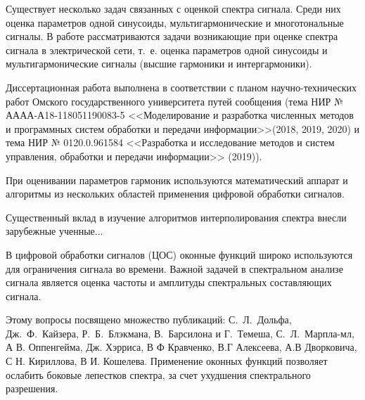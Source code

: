 Существует несколько задач связанных с оценкой спектра сигнала. Среди них оценка параметров одной синусоиды, мультигармонические и многотональные сигналы. В работе рассматриваются задачи возникающие при оценке спектра сигнала в электрической сети, т.~е. оценка параметров одной синусоиды и мультигармонические сигналы (высшие гармоники и интергармоники).


Диссертационная работа выполнена в соответствии с планом научно-технических работ Омского государственного университета путей сообщения (тема НИР № АААА-А18-118051190083-5 <<Моделирование и разработка численных методов и программных систем обработки и
передачи информации>>(2018, 2019, 2020) и тема НИР № 0120.0.961584 <<Разработка и исследование методов и систем управления,
обработки и передачи информации>> (2019)).

{\progress}
При оценивании параметров гармоник используются математический аппарат и алгоритмы из нескольких областей применения цифровой обработки сигналов.

Существенный вклад в изучение алгоритмов интерполирования спектра внесли зарубежные ученные... 

В цифровой обработки сигналов (ЦОС) оконные функций широко используются для ограничения сигнала во времени. Важной задачей в спектральном анализе сигнала является оценка частоты и амплитуды спектральных составляющих сигнала. 

Этому вопросы посвящено множество публикаций: С.~Л.~Дольфа, Дж.~Ф.~Кайзера, Р.~Б.~Блэкмана, В.~Барсилона и Г.~Темеша, С.~Л.~Марпла-мл, А В. Оппенгейма, Дж. Хэрриса, В Ф Кравченко, В.Г Алексеева, А.В Дворковича, С Н. Кириллова, В И. Кошелева.
Применение оконных функций позволяет ослабить боковые лепестков спектра, за счет ухудшения спектрального разрешения.


